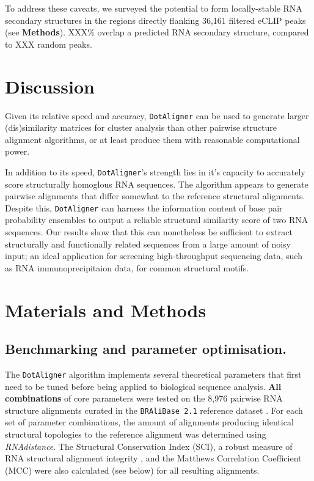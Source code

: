 \documentclass[a4paper,11pt]{article}
\newcommand\dotaligner{\texttt{DotAligner}}
\newcommand\bralibase{\texttt{BRAliBase 2.1}}
\begin{document}
To address these caveats, we surveyed the potential to form locally-stable
RNA secondary structures in the regions directly flanking 36,161 filtered eCLIP 
peaks (see \textbf{Methods}). XXX\% overlap a predicted RNA secondary structure, 
compared to XXX random peaks. \\


\section*{Discussion}
Given its relative speed and accuracy, \dotaligner{} can be used to generate larger 
(dis)similarity matrices for cluster analysis than other pairwise structure 
alignment algorithms, or at least produce them with reasonable computational 
power.  

In addition to its speed, \dotaligner{}'s strength lies in it's capacity to accurately
score structurally homoglous RNA sequences. The algorithm appears to 
generate pairwise alignments that differ somewhat to the reference 
structural alignments. Despite this, \dotaligner{} can harness the information
content of base pair probability ensembles to output a reliable 
structural similarity score of two RNA sequences. Our results show that this
can nonetheless be sufficient to extract structurally and functionally related
sequences from a large amount of noisy input; an ideal application 
for screening high-throughput sequencing data, such as RNA 
immunoprecipitaion data, for common structural motifs. 

\section*{ Materials and Methods }
\subsection*{ Benchmarking and parameter optimisation. }
The \dotaligner{} algorithm implements several theoretical parameters that first need to 
be tuned before being applied to biological sequence analysis.\textbf{ All combinations} of 
core parameters were tested on the 8,976 pairwise RNA structure alignments curated in the 
\bralibase{} reference dataset \cite{Wilm2006enhanced}. For each set of parameter combinations, 
the amount of alignments producing identical structural topologies to the reference alignment
was determined using \textit{RNAdistance}. The Structural Conservation Index (SCI), a robust 
measure of RNA structural alignment integrity \cite{gruber2008strategies}, and the Matthews Correlation Coefficient (MCC) were also calculated (see below) for all resulting alignments. 
\end{document}
